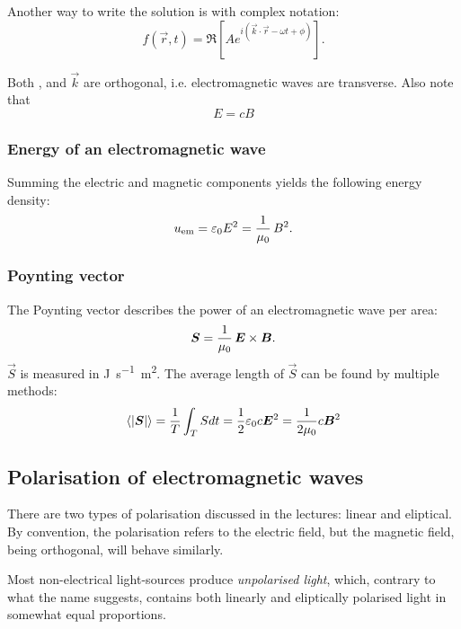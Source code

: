         Another way to write the solution is with complex notation: 
        \begin{equation*}
            f(\vec{r}, t) = \Re\left[Ae^{i\left(\vec{k}\cdot\vec{r} - \omega t + \phi\right)}\right].
        \end{equation*}

        Both \E, \B{} and $\vec{k}$ are orthogonal, i.e. electromagnetic waves are transverse. Also note that 
        \begin{equation}
            E = cB
        \end{equation}

    \subsubsection{Energy of an electromagnetic wave}
        Summing the electric and magnetic components yields the following energy density: 
        \begin{equation}
            u_{\text{em}} = \varepsilon_0 E^2 = \frac{1}{\mu_0}\, B^2.
        \end{equation}
    
    \subsubsection{Poynting vector}
        The Poynting vector describes the power of an electromagnetic wave per area:
        \begin{equation}
            \bm{S} = \frac{1}{\mu_0}\,\bm{E}\times\bm{B}.
        \end{equation}
        $\vec{S}$ is measured in \si{\joule\per\second\metre\squared}.
        The average length of $\vec{S}$ can be found by multiple methods:
        \begin{equation}
            \left<|\vec{S}|\right> = \frac{1}{T}\int_T Sdt = \frac{1}{2}\e c\E^2 = \frac{1}{2\mu_0}c\B^2
        \end{equation}
    
\subsection{Polarisation of electromagnetic waves}
    There are two types of polarisation discussed in the lectures: linear and eliptical.
    By convention, the polarisation refers to the electric field, 
    but the magnetic field, being orthogonal, will behave similarly.
    
    Most non-electrical light-sources produce \textit{unpolarised light}, which, contrary to what the name suggests, 
    contains both linearly and eliptically polarised light in somewhat equal proportions. 

